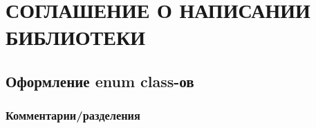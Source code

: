 \chapter{СОГЛАШЕНИЕ О НАПИСАНИИ БИБЛИОТЕКИ}

\section{Оформление enum class-ов}
\subsection{Комментарии/разделения}
\fi